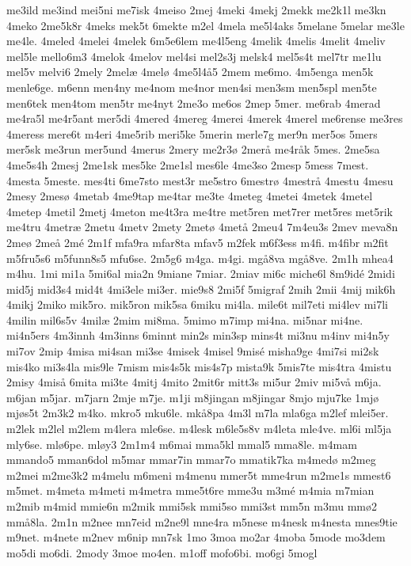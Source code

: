 me3ild
me3ind
mei5ni
me7isk
4meiso
2mej
4meki
4mekj
2mekk
me2k1l
me3kn
4meko
2me5k8r
4meks
mek5t
6mekte
m2el
4mela
me5l4aks
5melane
5melar
me3le
me4le.
4meled
4melei
4melek
6m5e6lem
me4l5eng
4melik
4melis
4melit
4meliv
mel5le
mello6m3
4melok
4melov
mel4si
mel2s3j
melsk4
mel5s4t
mel7tr
me1lu
mel5v
melvi6
2mely
2mel^^e6
4mel^^f8
4me5l4^^e55
2mem
me6mo.
4m5enga
men5k
menle6ge.
m6enn
men4ny
me4nom
me4nor
men4si
men3sm
men5spl
men5te
men6tek
men4tom
men5tr
me4nyt
2me3o
me6os
2mep
5mer.
me6rab
4merad
me4ra5l
me4r5ant
mer5di
4mered
4mereg
4merei
4merek
4merel
me6rense
me3res
4meress
mere6t
m4eri
4me5rib
meri5ke
5merin
merle7g
mer9n
mer5os
5mers
mer5sk
me3run
mer5und
4merus
2mery
me2r3^^f8
2mer^^e5
me4r^^e5k
5mes.
2me5sa
4me5s4h
2mesj
2me1sk
mes5ke
2me1sl
mes6le
4me3so
2mesp
5mess
7mest.
4mesta
5meste.
mes4ti
6me7sto
mest3r
me5stro
6mestr^^f8
4mestr^^e5
4mestu
4mesu
2mesy
2mes^^f8
4metab
4me9tap
me4tar
me3te
4meteg
4metei
4metek
4metel
4metep
4metil
2metj
4meton
me4t3ra
me4tre
met5ren
met7rer
met5res
met5rik
me4tru
4metr^^e6
2metu
4metv
2mety
2met^^f8
4met^^e5
2meu4
7m4eu3s
2mev
meva8n
2me^^f8
2me^^e5
2m^^e9
2m1f
mfa9ra
mfar8ta
mfav5
m2fek
m6f3ess
m4fi.
m4fibr
m2fit
m5fru5s6
m5funn8s5
mfu6se.
2m5g6
m4ga.
m4gi.
mg^^e58va
mg^^e58ve.
2m1h
mhea4
m4hu.
1mi
mi1a
5mi6al
mia2n
9miane
7miar.
2miav
mi6c
miche6l
8m9id^^e9
2midi
mid5j
mid3s4
mid4t
4mi3ele
mi3er.
mie9s8
2mi5f
5migraf
2mih
2mii
4mij
mik6h
4mikj
2miko
mik5ro.
mik5ron
mik5sa
6miku
mi4la.
mile6t
mil7eti
mi4lev
mi7li
4milin
mil6s5v
4mil^^e6
2mim
mi8ma.
5mimo
m7imp
mi4na.
mi5nar
mi4ne.
mi4n5ers
4m3innh
4m3inns
6minnt
min2s
min3sp
mins4t
mi3nu
m4inv
mi4n5y
mi7ov
2mip
4misa
mi4san
mi3se
4misek
4misel
9mis^^e9
misha9ge
4mi7si
mi2sk
mis4ko
mi3s4la
mis9le
7mism
mis4s5k
mis4s7p
mista9k
5mis7te
mis4tra
4mistu
2misy
4mis^^e5
6mita
mi3te
4mitj
4mito
2mit6r
mitt3s
mi5ur
2miv
mi5v^^e5
m6ja.
m6jan
m5jar.
m7jarn
2mje
m7je.
m1ji
m8jingan
m8jingar
8mjo
mju7ke
1mj^^f8
mj^^f8s5t
2m3k2
m4ko.
mkro5
mku6le.
mk^^e58pa
4m3l
m7la
mla6ga
m2lef
mlei5er.
m2lek
m2lel
m2lem
m4lera
mle6se.
m4lesk
m6le5s8v
m4leta
mle4ve.
ml6i
ml5ja
mly6se.
ml^^f86pe.
ml^^f8y3
2m1m4
m6mai
mma5kl
mmal5
mma8le.
m4mam
mmando5
mman6dol
m5mar
mmar7in
mmar7o
mmatik7ka
m4med^^f8
m2meg
m2mei
m2me3k2
m4melu
m6meni
m4menu
mmer5t
mme4run
m2me1s
mmest6
m5met.
m4meta
m4meti
m4metra
mme5t6re
mme3u
m3m^^e9
m4mia
m7mian
m2mib
m4mid
mmie6n
m2mik
mmi5sk
mmi5so
mmi3st
mm5n
m3mu
mm^^f82
mm^^e58la.
2m1n
m2nee
mn7eid
m2ne9l
mne4ra
m5nese
m4nesk
m4nesta
mnes9tie
m9net.
m4nete
m2nev
m6nip
mn7sk
1mo
3moa
mo2ar
4moba
5mode
mo3dem
mo5di
mo6di.
2mody
3moe
mo4en.
m1off
mofo6bi.
mo6gi
5mogl
